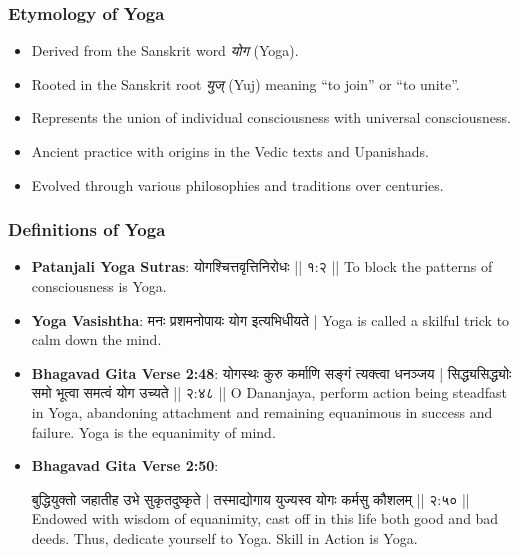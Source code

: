 \begin{frame}[fragile]\frametitle{Etymology of Yoga}

      \begin{itemize}
		\item Derived from the Sanskrit word \textit{योग} (Yoga).
		\item Rooted in the Sanskrit root \textit{युज्} (Yuj) meaning “to join” or “to unite”.
		\item Represents the union of individual consciousness with universal consciousness.
		\item Ancient practice with origins in the Vedic texts and Upanishads.
		\item Evolved through various philosophies and traditions over centuries.
	  \end{itemize}

\end{frame}

\begin{frame}[fragile]\frametitle{Definitions of Yoga}
      \begin{itemize}
        \item \textbf{Patanjali Yoga Sutras}:      योगश्चित्तवृत्तिनिरोधः || १:२ || 
          To block the patterns of consciousness is Yoga.

        \item \textbf{Yoga Vasishtha}:          मनः प्रशमनोपायः योग इत्यभिधीयते |
          Yoga is called a skilful trick to calm down the mind.
        \item \textbf{Bhagavad Gita Verse 2:48}:         योगस्थः कुरु कर्माणि सङ्गं त्यक्त्वा धनञ्जय |
          सिद्ध्यसिद्ध्योः समो भूत्वा समत्वं योग उच्यते || २:४८ ||
          O Dananjaya, perform action being steadfast in Yoga, abandoning attachment and remaining equanimous in success and failure. Yoga is the equanimity of mind.

        \item \textbf{Bhagavad Gita Verse 2:50}:
          
          बुद्धियुक्तो जहातीह उभे सुकृतदुष्कृते |
          तस्माद्योगाय युज्यस्व योगः कर्मसु कौशलम् || २:५० ||
          Endowed with wisdom of equanimity, cast off in this life both good and bad deeds. Thus, dedicate yourself to Yoga. Skill in Action is Yoga.
          
      \end{itemize}
\end{frame}


